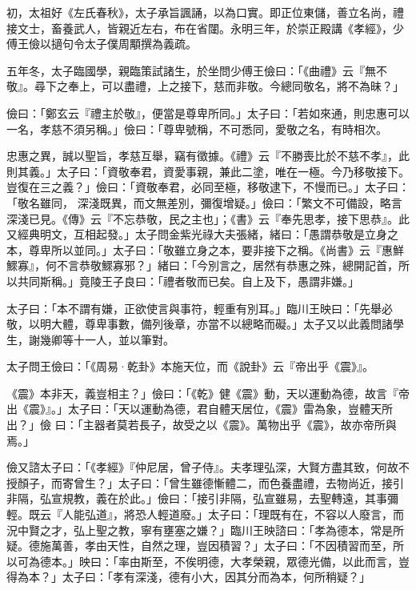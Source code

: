 \begin{pinyinscope}
 初，太祖好《左氏春秋》，太子承旨諷誦，以為口實。即正位東儲，善立名尚，禮接文士，畜養武人，皆親近左右，布在省闥。永明三年，於崇正殿講《孝經》，少傅王儉以擿句令太子僕周顒撰為義疏。



 五年冬，太子臨國學，親臨策試諸生，於坐問少傅王儉曰：「《曲禮》云『無不敬』。尋下之奉上，可以盡禮，上之接下，慈而非敬。今總同敬名，將不為昧？」



 儉曰：「鄭玄云『禮主於敬』，便當是尊卑所同。」太子曰：「若如來通，則忠惠可以一名，孝慈不須另稱。」儉曰：「尊卑號稱，不可悉同，愛敬之名，有時相次。



 忠惠之異，誠以聖旨，孝慈互舉，竊有徵據。《禮》云『不勝喪比於不慈不孝』，此則其義。」太子曰：「資敬奉君，資愛事親，兼此二塗，唯在一極。今乃移敬接下。豈復在三之義？」儉曰：「資敬奉君，必同至極，移敬逮下，不慢而已。」太子曰：「敬名雖同，
 深淺既異，而文無差別，彌復增疑。」儉曰：「繁文不可備設，略言深淺已見。《傳》云『不忘恭敬，民之主也」；《書》云『奉先思孝，接下思恭』。此又經典明文，互相起發。」太子問金紫光祿大夫張緒，緒曰：「愚謂恭敬是立身之本，尊卑所以並同。」太子曰：「敬雖立身之本，要非接下之稱。《尚書》云『惠鮮鰥寡』，何不言恭敬鰥寡邪？」緒曰：「今別言之，居然有恭惠之殊，總開記首，所以共同斯稱。」竟陵王子良曰：「禮者敬而已矣。自上及下，愚謂非嫌。」



 太子曰：「本不謂有嫌，正欲使言與事符，輕重有別耳。」臨川王映曰：「先舉必敬，以明大體，尊卑事數，備列後章，亦當不以總略而礙。」太子又以此義問諸學生，謝幾卿等十一人，並以筆對。



 太子問王儉曰：「《周易·乾卦》本施天位，而《說卦》云『帝出乎《震》』。



 《震》本非天，義豈相主？」儉曰：「《乾》健《震》動，天以運動為德，故言『帝出《震》』。」太子曰：「天以運動為德，君自體天居位，《震》雷為象，豈體天所出？」儉
 曰：「主器者莫若長子，故受之以《震》。萬物出乎《震》，故亦帝所與焉。」



 儉又諮太子曰：「《孝經》『仲尼居，曾子侍』。夫孝理弘深，大賢方盡其致，何故不授顏子，而寄曾生？」太子曰：「曾生雖德慚體二，而色養盡禮，去物尚近，接引非隔，弘宣規教，義在於此。」儉曰：「接引非隔，弘宣雖易，去聖轉遠，其事彌輕。既云『人能弘道』，將恐人輕道廢。」太子曰：「理既有在，不容以人廢言，而況中賢之才，弘上聖之教，寧有壅塞之嫌？」臨川王映諮曰：「孝為德本，常是所疑。德施萬善，孝由天性，自然之理，豈因積習？」太子曰：「不因積習而至，所以可為德本。」映曰：「率由斯至，不俟明德，大孝榮親，眾德光備，以此而言，豈得為本？」太子曰：「孝有深淺，德有小大，因其分而為本，何所稍疑？」




\end{pinyinscope}
